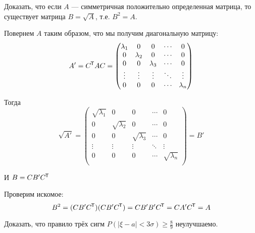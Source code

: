 \begin{exercise}
    Доказать, что если \(A\) --- симметричная положительно определенная матрица, то существует матрица \(B = \sqrt{A}\), т.е. \(B^2 = A\).
\end{exercise}
\begin{solution}
    Повернем \(A\) таким образом, что мы получим диагональную матрицу:
    \[A' = C^{\mkern-1.5mu\mathsf{T}} A C = \begin{pmatrix}
            \lambda_1 & 0         & 0         & \cdots & 0         \\
            0         & \lambda_2 & 0         & \cdots & 0         \\
            0         & 0         & \lambda_3 & \cdots & 0         \\
            \vdots    & \vdots    & \vdots    & \ddots & \vdots    \\
            0         & 0         & 0         & \cdots & \lambda_n \\
        \end{pmatrix}\]

    Тогда
    \[\sqrt{A'} = \begin{pmatrix}
            \sqrt{\lambda_1} & 0                & 0                & \cdots & 0                \\
            0                & \sqrt{\lambda_2} & 0                & \cdots & 0                \\
            0                & 0                & \sqrt{\lambda_3} & \cdots & 0                \\
            \vdots           & \vdots           & \vdots           & \ddots & \vdots           \\
            0                & 0                & 0                & \cdots & \sqrt{\lambda_n} \\
        \end{pmatrix} = B'\]

    И \(B = C B' C^{\mkern-1.5mu\mathsf{T}} \)

    Проверим искомое:
    \[B^2 = (CB'C^{\mkern-1.5mu\mathsf{T}} )(CB'C^{\mkern-1.5mu\mathsf{T}} ) = CB'B'C^{\mkern-1.5mu\mathsf{T}} = CA'C^{\mkern-1.5mu\mathsf{T}} = A\]
\end{solution}

\begin{exercise}
    Доказать, что правило трёх сигм \(P(|\xi - a| < 3\sigma) \geq \frac{8}{9}\) неулучшаемо.
\end{exercise}


